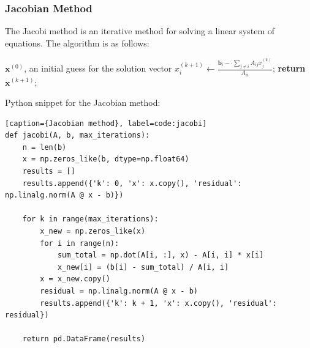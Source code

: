 \documentclass[10pt]{article}
\begin{document}
\subsubsection{Jacobian Method}
The Jacobi method is an iterative method for solving a linear system of equations. The algorithm is as follows:
\begin{algorithm}[H]
\caption{Jacobi Method}
\begin{algorithmic}
\State $\mathbf{x}^{(0)}$, an initial guess for the solution vector\;
        \State $x_i^{(k+1)} \gets \frac{\mathbf{b}_i - \cdot \sum_{j \neq i} A_{ij} x_j^{(k)}}{A_{ii}}$;
    \EndFor
\State \textbf{return} $\mathbf{x}^{(k+1)}$;
\end{algorithmic}
\end{algorithm}
Python snippet for the Jacobian method:
\begin{lstlisting}[style=custompython][caption={Jacobian method}, label=code:jacobi]
def jacobi(A, b, max_iterations):
    n = len(b)
    x = np.zeros_like(b, dtype=np.float64)
    results = []
    results.append({'k': 0, 'x': x.copy(), 'residual': np.linalg.norm(A @ x - b)})
    
    for k in range(max_iterations):
        x_new = np.zeros_like(x)
        for i in range(n):
            sum_total = np.dot(A[i, :], x) - A[i, i] * x[i]
            x_new[i] = (b[i] - sum_total) / A[i, i]
        x = x_new.copy()
        residual = np.linalg.norm(A @ x - b)
        results.append({'k': k + 1, 'x': x.copy(), 'residual': residual})
    
    return pd.DataFrame(results)
\end{lstlisting}
\end{document}
